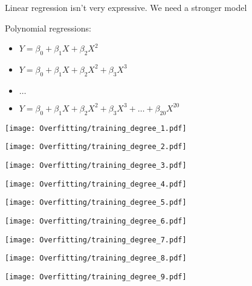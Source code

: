 \documentclass[xcolor=pdftex,dvipsnames,table]{beamer}
\begin{document}
\frame
{
	Linear regression isn't very expressive. We need a stronger model
}

\frame
{
	Polynomial regressions:
	\begin{itemize}
		\item{$Y = \beta_{0} + \beta_{1} X + \beta_{2} X ^ 2$}
		\item{$Y = \beta_{0} + \beta_{1} X + \beta_{2} X ^ 2 + \beta_{3} X ^ 3$}
		\item{$\ldots$}
		\item{$Y = \beta_{0} + \beta_{1} X + \beta_{2} X ^ 2 + \beta_{3} X ^ 3 + \ldots + \beta_{20} X ^ {20}$}
	\end{itemize}
}

\frame
{
	\begin{center}
		\texttt{[image: Overfitting/training\_degree\_1.pdf]}
	\end{center}
}

\frame
{
	\begin{center}
		\texttt{[image: Overfitting/training\_degree\_2.pdf]}
	\end{center}
}

\frame
{
	\begin{center}
		\texttt{[image: Overfitting/training\_degree\_3.pdf]}
	\end{center}
}

\frame
{
	\begin{center}
		\texttt{[image: Overfitting/training\_degree\_4.pdf]}
	\end{center}
}

\frame
{
	\begin{center}
		\texttt{[image: Overfitting/training\_degree\_5.pdf]}
	\end{center}
}

\frame
{
	\begin{center}
		\texttt{[image: Overfitting/training\_degree\_6.pdf]}
	\end{center}
}

\frame
{
	\begin{center}
		\texttt{[image: Overfitting/training\_degree\_7.pdf]}
	\end{center}
}

\frame
{
	\begin{center}
		\texttt{[image: Overfitting/training\_degree\_8.pdf]}
	\end{center}
}

\frame
{
	\begin{center}
		\texttt{[image: Overfitting/training\_degree\_9.pdf]}
	\end{center}
}
\end{document}
